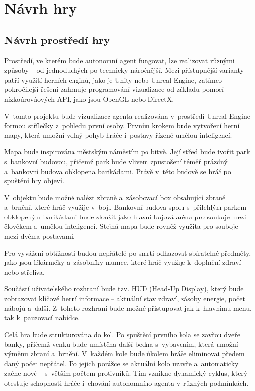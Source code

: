 \newpage

\section{Návrh hry}
\subsection{Návrh prostředí hry}
Prostředí, ve kterém bude autonomní agent fungovat, lze realizovat různými způsoby – od jednoduchých po technicky náročnější. Mezi přístupnější varianty patří využití herních enginů, jako je Unity nebo Unreal Engine, zatímco pokročilejší řešení zahrnuje programování vizualizace od základu pomocí nízkoúrovňových API, jako jsou OpenGL nebo DirectX.

V~tomto projektu bude vizualizace agenta realizována v~prostředí Unreal Engine formou střílečky z~pohledu první osoby. Prvním krokem bude vytvoření herní mapy, která umožní volný pohyb hráče i~postavy řízené umělou inteligencí.

Mapa bude inspirována městským náměstím po bitvě. Její střed bude tvořit park s~bankovní budovou, přičemž park bude vlivem zpustošení téměř prázdný a~bankovní budova obklopena barikádami. Právě v~této budově se hráč po spuštění hry objeví.

V~objektu bude možné nalézt zbraně a~zásobovací box obsahující zbraně a~brnění, které hráč využije v~boji. Bankovní budova spolu s~přilehlým parkem obklopeným barikádami bude sloužit jako hlavní bojová aréna pro souboje mezi člověkem a~umělou inteligencí. Stejná mapa bude rovněž využita pro souboje mezi dvěma postavami.

Pro vyvážení obtížnosti budou nepřátelé po smrti odhazovat sbíratelné předměty, jako jsou lékárničky a~zásobníky munice, které hráč využije k~doplnění zdraví nebo střeliva.

Součástí uživatelského rozhraní bude tzv. HUD (Head-Up Display), který bude zobrazovat klíčové herní informace – aktuální stav zdraví, zásoby energie, počet nábojů a~další. Z~tohoto rozhraní bude možné přistupovat jak k~hlavnímu menu, tak k~pauzovací nabídce.

Celá hra bude strukturována do kol. Po spuštění prvního kola se zavřou dveře banky, přičemž venku bude umístěna další bedna s~vybavením, která umožní výměnu zbraní a~brnění. V~každém kole bude úkolem hráče eliminovat předem daný počet nepřátel. Po jejich porážce se aktuální kolo uzavře a~automaticky začne nové – s~větším počtem protivníků. Tím vznikne dynamický cyklus, který otestuje schopnosti hráče i~chování autonomního agenta v~různých podmínkách.

